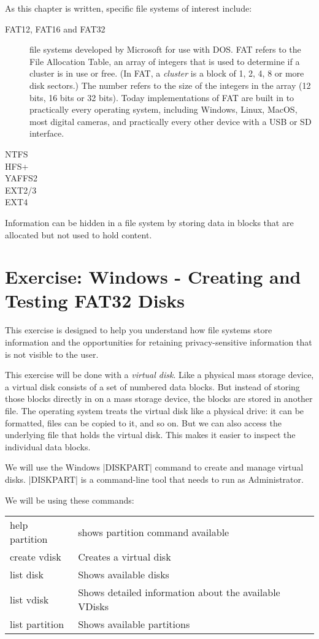 \documentclass[11pt,letter]{book}
\begin{document}
As this chapter is written, specific file systems of interest include:
\begin{description}
\item[FAT12, FAT16 and FAT32] file systems developed by Microsoft for use with
  DOS. FAT refers to the File Allocation Table, an array of integers
  that is used to determine if a cluster is in use or free. (In FAT, a
  \emph{cluster} is a block of 1, 2, 4, 8 or more disk sectors.) The number
  refers to the size of the integers in the array (12 bits, 16 bits or
  32 bits). Today implementations of FAT are built in to practically every
  operating system, including Windows, Linux, MacOS, most digital
  cameras, and practically every other device with a USB or SD
  interface. 
\item[NTFS] 
\item[HFS+]
\item[YAFFS2]
\item[EXT2/3]
\item[EXT4]
\end{description}

Information can be hidden in a file system by storing data in blocks
that are allocated but not used to hold content\cite{dfrws2005:KnutEcksteinAndMarkoJahnke}. 

\section{Exercise: Windows - Creating and Testing FAT32 Disks}

This exercise is designed to help you understand how file systems
store information and the opportunities for retaining
privacy-sensitive information that is not visible to the user. 

This exercise will be done with a \emph{virtual disk}. Like a physical
mass storage device, a virtual disk consists of a set of numbered data
blocks. But instead of storing those blocks directly in on a mass
storage device, the blocks are stored in another file. The operating
system treats the virtual disk like a physical drive: it can be
formatted, files can be copied to it, and so on. But we can also
access the underlying file that holds the virtual disk. This makes it
easier to inspect the individual data blocks.

We will use the Windows |DISKPART| command to create and manage virtual
disks. |DISKPART| is a command-line tool that needs to run as
Administrator.

We will be using these commands:
\begin{tabular}{ll}
help partition & shows partition command available\\
create vdisk & Creates a virtual disk \\
list disk & Shows available disks \\
list vdisk & Shows detailed information about the available VDisks\\
list partition & Shows available partitions \\
\end{tabular}
\end{document}
